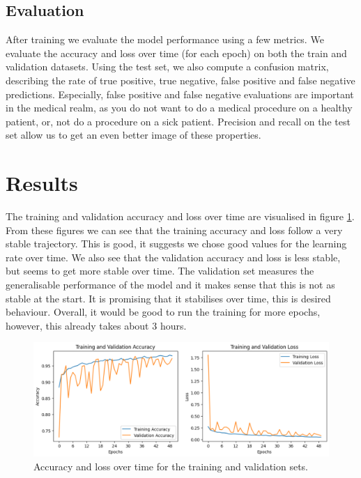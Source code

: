 \documentclass[a4paper]{article}
\begin{document}
\subsection{Evaluation}

After training we evaluate the model performance using a few metrics. We
evaluate the accuracy and loss over time (for each epoch) on both the train and
validation datasets. Using the test set, we also compute a confusion matrix,
describing the rate of true positive, true negative, false positive and false
negative predictions. Especially, false positive and false negative evaluations
are important in the medical realm, as you do not want to do a medical
procedure on a healthy patient, or, not do a procedure on a sick patient.
Precision and recall on the test set allow us to get an even better image of
these properties.

\section{Results}\label{sec: results}

The training and validation accuracy and loss over time are visualised in
figure \ref{fig: history}. From these figures we can see that the training
accuracy and loss follow a very stable trajectory. This is good, it suggests we
chose good values for the learning rate over time. We also see that the
validation accuracy and loss is less stable, but seems to get more stable over
time. The validation set measures the generalisable performance of the model
and it makes sense that this is not as stable at the start. It is promising
that it stabilises over time, this is desired behaviour. Overall, it would be
good to run the training for more epochs, however, this already takes about 3
hours.

\begin{figure}[h]
	\centering
	\includegraphics[width = \textwidth]{imgs/history.png}
	\caption{Accuracy and loss over time for the training and validation sets.}
	\label{fig: history}
\end{figure}
\end{document}
